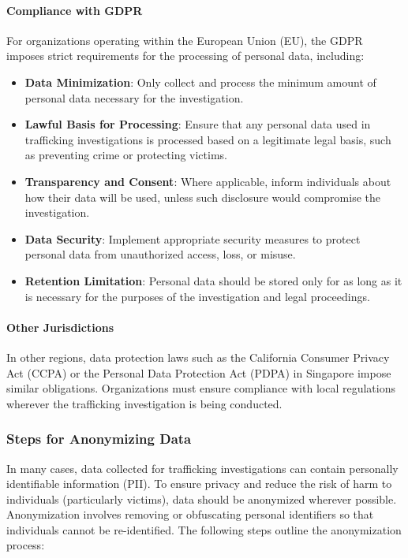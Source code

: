 \documentclass[%
 preprint, linenumbers,
 amsmath,amssymb,
 aps, physrev,
]{revtex4-2}
\begin{document}
\paragraph{Compliance with GDPR}
For organizations operating within the European Union (EU), the GDPR imposes strict requirements for the processing of personal data, including:
\begin{itemize}
    \item \textbf{Data Minimization}: Only collect and process the minimum amount of personal data necessary for the investigation.
    \item \textbf{Lawful Basis for Processing}: Ensure that any personal data used in trafficking investigations is processed based on a legitimate legal basis, such as preventing crime or protecting victims.
    \item \textbf{Transparency and Consent}: Where applicable, inform individuals about how their data will be used, unless such disclosure would compromise the investigation.
    \item \textbf{Data Security}: Implement appropriate security measures to protect personal data from unauthorized access, loss, or misuse.
    \item \textbf{Retention Limitation}: Personal data should be stored only for as long as it is necessary for the purposes of the investigation and legal proceedings.
\end{itemize}

\paragraph{Other Jurisdictions}
In other regions, data protection laws such as the California Consumer Privacy Act (CCPA) or the Personal Data Protection Act (PDPA) in Singapore impose similar obligations. Organizations must ensure compliance with local regulations wherever the trafficking investigation is being conducted.

\subsubsection{Steps for Anonymizing Data}

In many cases, data collected for trafficking investigations can contain personally identifiable information (PII). To ensure privacy and reduce the risk of harm to individuals (particularly victims), data should be anonymized wherever possible. Anonymization involves removing or obfuscating personal identifiers so that individuals cannot be re-identified. The following steps outline the anonymization process:
\end{document}
